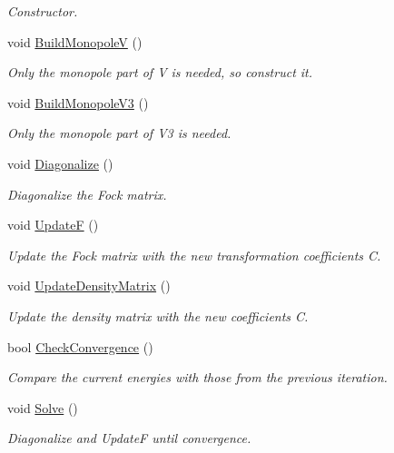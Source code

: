 \begin{DoxyCompactItemize}
\begin{DoxyCompactList}\small\item\em Constructor. \end{DoxyCompactList}\item 
void \hyperlink{classHartreeFock_a3d6bac9b4403e4bc599a89ad0c9b6056}{Build\+MonopoleV} ()
\begin{DoxyCompactList}\small\item\em Only the monopole part of V is needed, so construct it. \end{DoxyCompactList}\item 
void \hyperlink{classHartreeFock_a1c146af25a09f427cc626d877ec6e518}{Build\+Monopole\+V3} ()
\begin{DoxyCompactList}\small\item\em Only the monopole part of V3 is needed. \end{DoxyCompactList}\item 
void \hyperlink{classHartreeFock_a00f7b0c4cb7373a3f1a69ca27a4dfaed}{Diagonalize} ()
\begin{DoxyCompactList}\small\item\em Diagonalize the Fock matrix. \end{DoxyCompactList}\item 
void \hyperlink{classHartreeFock_a84fe0eb16f6e5835c920bf8fa98c4442}{UpdateF} ()
\begin{DoxyCompactList}\small\item\em Update the Fock matrix with the new transformation coefficients C. \end{DoxyCompactList}\item 
void \hyperlink{classHartreeFock_aad38c905e7e9f9e9757b5800e6910c61}{Update\+Density\+Matrix} ()
\begin{DoxyCompactList}\small\item\em Update the density matrix with the new coefficients C. \end{DoxyCompactList}\item 
bool \hyperlink{classHartreeFock_a35ab9c4f96e68b1c9acea1d1407ecc60}{Check\+Convergence} ()
\begin{DoxyCompactList}\small\item\em Compare the current energies with those from the previous iteration. \end{DoxyCompactList}\item 
void \hyperlink{classHartreeFock_a0666507747c17845ab4f74b97414703c}{Solve} ()
\begin{DoxyCompactList}\small\item\em Diagonalize and UpdateF until convergence. \end{DoxyCompactList}\item 

\end{DoxyCompactItemize}
